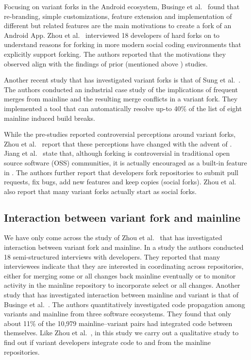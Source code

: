 Focusing on variant forks in the Android ecosystem, Businge et al.~\cite{businge2018appfamilies} found that re-branding, simple customizations, feature extension and implementation of different but related features are the main motivations to create a fork of an Android App.
Zhou et al.~\cite{Zhou:2020} interviewed 18 developers of hard forks on \gh to understand reasons for forking in more modern social coding environments that explicitly support forking. The authors reported that the motivations they observed align with the findings of prior (mentioned above ) studies.

Another recent study that has investigated variant forks is that of Sung et al.~\cite{sung:ICSE:2020}. The authors conducted an industrial case study of the implications of frequent merges from mainline and the resulting merge conflicts in a variant fork. They implemented a tool that can automatically resolve up-to 40\% of the list of eight mainline induced build breaks.

While the pre-\gh studies reported controversial perceptions around variant forks, Zhou et al.~\cite{Zhou:2020} report that these perceptions have changed with the advent of \gh. Jiang et al.~\cite{Lo:2017} state that, although forking is controversial in traditional open source software (OSS) communities, it is actually encouraged as a built-in feature in \gh. The authors further report that developers fork repositories to submit pull requests, fix bugs, add new features and keep copies (social forks).
Zhou et al.~\cite{Zhou:2020} also report that many variant forks actually start as social forks.

\subsection{Interaction between variant fork and mainline}
We have only come across the study of Zhou et al.~\cite{Zhou:2020} that has investigated interaction between variant fork and mainline.
In a study the authors conducted 18 semi-structured interviews with developers. They reported that many interviewees indicate that they are interested in coordinating across repositories, either for merging some or all changes back mainline eventually or to monitor activity in the mainline repository to incorporate select or all changes. Another study that has investigated interaction between mainline and variant is that of Businge et al.~\cite{businge:emse:2021}. The authors quantitatively investigated code propagation among variants and mainline from three software ecosystems. They found that only about 11\% of the 10,979 mainline--variant pairs had integrated code between themselves. Like Zhou et al.~\cite{Zhou:2020}, in this study we carry out a qualitative study to find out if variant developers integrate code to and from the mainline repositories.

